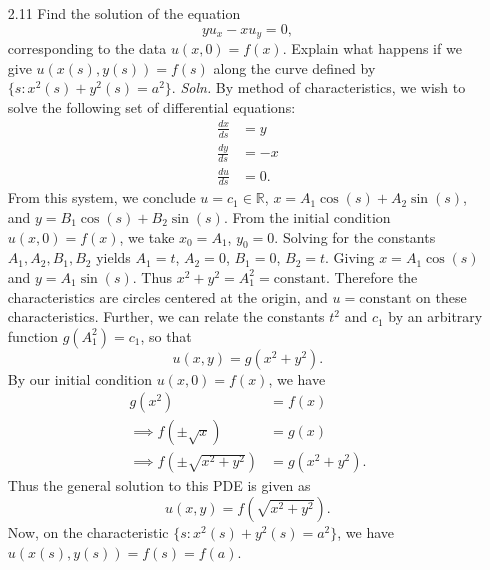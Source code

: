 \documentclass{article}
\begin{document}
\begin{itemize}
    \item[2.11] Find the solution of the equation
    \[yu_x - xu_y = 0,\]
    corresponding to the data $u(x,0) = f(x)$. Explain what happens if we give $u(x(s),y(s)) = f(s)$ along the curve defined by $\{s : x^2(s) + y^2(s) = a^2\}.$
    \newline\newline
    \textit{Soln.} By method of characteristics, we wish to solve the following set of differential equations:
    \begin{align*}
        \frac{dx}{ds} &= y\\
        \frac{dy}{ds} &= -x\\
        \frac{du}{ds} &= 0.
    \end{align*}
    From this system, we conclude $u = c_1 \in \mathbb{R}$, $x = A_1\cos(s) + A_2\sin(s)$, and $y = B_1\cos(s) + B_2\sin(s)$. From the initial condition $u(x,0) = f(x)$, we take $x_0 = A_1$, $y_0 = 0$. Solving for the constants $A_1,A_2,B_1,B_2$ yields $A_1 = t$, $A_2 = 0$, $B_1 = 0$, $B_2 = t$. Giving $x = A_1\cos(s)$ and $y = A_1\sin(s)$. Thus $x^2 + y^2 = A_1^2 = \text{constant}$. Therefore the characteristics are circles centered at the origin, and $u = \text{constant}$ on these characteristics. Further, we can relate the constants $t^2$ and $c_1$ by an arbitrary function $g(A_1^2) = c_1$, so that 
    \[u(x,y) = g(x^2 + y^2).\]
    By our initial condition $u(x,0) = f(x)$, we have
    \begin{align*}
        g(x^2) &= f(x)\\
        \implies f\left(\pm\sqrt{x}\right) &= g(x)\\
        \implies f\left(\pm\sqrt{x^2 + y^2}\right) &= g(x^2 + y^2).
    \end{align*}
    Thus the general solution to this PDE is given as
    \[u(x,y) = f\left(\sqrt{x^2 + y^2}\right).\]
    Now, on the characteristic $\{s : x^2(s) + y^2(s) = a^2\}$, we have $u(x(s),y(s)) = f(s) = f(a)$.
\end{itemize}
\end{document}
